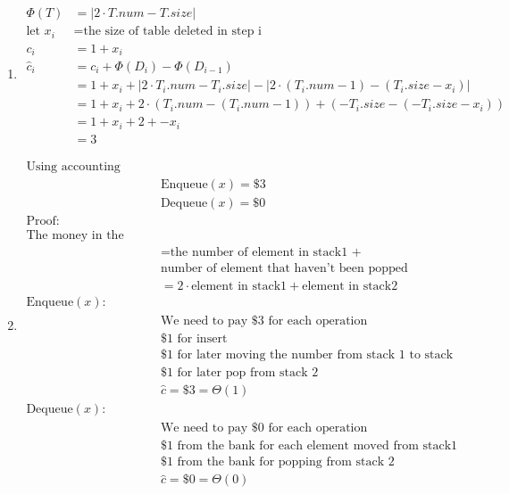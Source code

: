 \documentclass{article}
\begin{document}
	\begin{enumerate}
		\item {
			\begin{align*}
				\Phi(T) &= |2 \cdot T.num - T.size|\\
				\text{let } x_i &= \text{the size of table deleted in step i}\\
				c_i &= 1 + x_i\\
				\hat{c}_i &= c_i + \Phi(D_i) - \Phi(D_{i-1})\\
				&= 1 + x_i + |2 \cdot T_i.num -T_i.size| - 
							  |2\cdot (T_i.num - 1) - (T_i.size - x_i)| \\
				&= 1 + x_i + 2 \cdot (T_i.num - (T_i.num - 1)) + 
									 (-T_i.size - (-T_i.size - x_i))\\
				&= 1 + x_i + 2 + -x_i\\
				&= 3
			\end{align*}
		}
		\pagebreak
		\item{
			\begin{align*}
				\text{Using accounting method:}&\\
				&\text{Enqueue}(x) = \$3\\
				&\text{Dequeue}(x) = \$0\\
				\text{Proof:}&\\
				\text{The money in the bank:}&\\
				&=\text{the number of element in stack1 +}\\
				&\text{number of element that haven't been popped (stack1 + stack2)}\\
				&= 2\cdot \text{element in stack1}+\text{element in stack2}\\
			\text{Enqueue}(x):&\\
				&\text{We need to pay \$3 for each operation}\\
				&\$1\text{ for insert}\\
				&\$1\text{ for later moving the number from stack 1 to stack 2}\\
				&\$1\text{ for later pop from stack 2}\\
				&\hat{c} = \$3 = \Theta(1)\\
			\text{Dequeue}(x):&\\
				&\text{We need to pay \$0 for each operation}\\
				&\$1\text{ from the bank for each element moved from stack1 to stack2}\\
				&\$1\text{ from the bank for popping from stack 2}\\
				&\hat{c} = \$0 = \Theta(0)\\

\end{align*}}
\end{enumerate}
\end{document}
